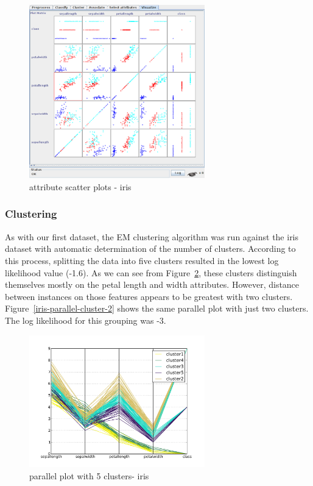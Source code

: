 \documentclass{sig-alternate}
\begin{document}
\begin{figure}[!htbp]
    \centering
    \includegraphics[width=3in]{part2/iris/attribute-scatter.pdf}
    \caption{attribute scatter plots - iris\label{iris-attr-scatter}}
\end{figure} 

\subsubsection{Clustering}


As with our first dataset, the EM clustering algorithm was run against the iris dataset with automatic determination of the number of clusters. According to this process, splitting the data into five clusters resulted in the lowest log likelihood value (-1.6). As we can see from Figure~\ref{iris-parallel-cluster-5}, these clusters distinguish themselves mostly on the petal length and width attributes. However, distance between instances on those features appears to be greatest with two clusters. Figure~\ref{iris-parallel-cluster-2} shows the same parallel plot with just two clusters. The log likelihood for this grouping was -3.

\begin{figure}[!htbp]
    \centering
    \includegraphics[width=3in]{part2/iris/parallel-cluster.pdf}
    \caption{parallel plot with 5 clusters- iris\label{iris-parallel-cluster-5}}
\end{figure} 
\end{document}
